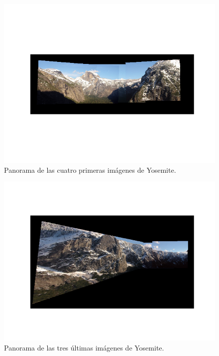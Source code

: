 \documentclass[11pt,a4paper]{article}
\begin{document}
\begin{figure}[H]
	\centering
	\includegraphics[scale=0.8]{img/pano-yos1}
	\caption{Panorama de las cuatro primeras imágenes de Yosemite.}
	\label{fig:pano-yos1}
\end{figure}

\begin{figure}[H]
	\centering
	\includegraphics[scale=0.7]{img/pano-yos2}
	\caption{Panorama de las tres últimas imágenes de Yosemite.}
	\label{fig:pano-yos2}
\end{figure}
\end{document}

